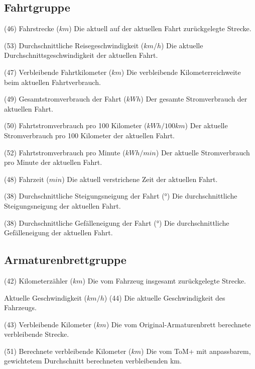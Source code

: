 \subsection{Fahrtgruppe}

{(46) Fahrstrecke (\(km\))}
{Die aktuell auf der aktuellen Fahrt zurückgelegte Strecke.}

{(53) Durchschnittliche Reisegeschwindigkeit (\(km/h\))}
{Die aktuelle Durchschnittsgeschwindigkeit der aktuellen Fahrt.}

{(47) Verbleibende Fahrtkilometer (\(km\))}
{Die verbleibende Kilometerreichweite beim aktuellen Fahrtverbrauch.}

{(49) Gesamtstromverbrauch der Fahrt (\(kWh\))}
{Der gesamte Stromverbrauch der aktuellen Fahrt.}

{(50) Fahrtstromverbrauch pro 100 Kilometer (\(kWh/100km\))}
{Der aktuelle Stromverbrauch pro 100 Kilometer der aktuellen Fahrt.}

{(52) Fahrtstromverbrauch pro Minute (\(kWh/min\))}
{Der aktuelle Stromverbrauch pro Minute der aktuellen Fahrt.}

{(48) Fahrzeit (\(min\))}
{Die aktuell verstrichene Zeit der aktuellen Fahrt.}

{(38) Durchschnittliche Steigungsneigung der Fahrt (°)}
{Die durchschnittliche Steigungsneigung der aktuellen Fahrt.}

{(38) Durchschnittliche Gefälleneigung der Fahrt (°)}
{Die durchschnittliche Gefälleneigung der aktuellen Fahrt.}

\subsection{Armaturenbrettgruppe}

{(42) Kilometerzähler (\(km\))}
{Die vom Fahrzeug insgesamt zurückgelegte Strecke.}

{Aktuelle Geschwindigkeit (\(km/h\))}
{(44) Die aktuelle Geschwindigkeit des Fahrzeugs.}

{(43) Verbleibende Kilometer (\(km\))}
{Die vom Original-Armaturenbrett berechnete verbleibende Strecke.}

{(51) Berechnete verbleibende Kilometer (\(km\))}
{Die vom ToM+ mit anpassbarem, gewichtetem Durchschnitt berechneten verbleibenden km.}
\label{fig:calculated_kilometers_left}

